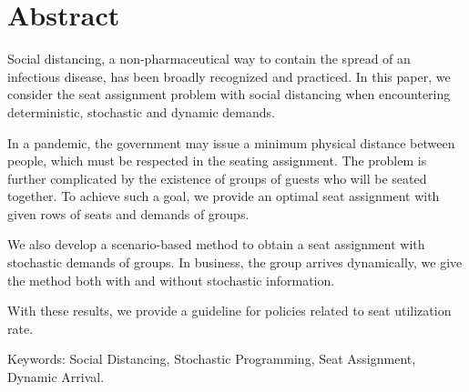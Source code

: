 
\section*{Abstract}
Social distancing, a non-pharmaceutical way to contain the spread of an infectious disease, has been broadly recognized and practiced. In this paper, we consider the seat assignment problem with social distancing when encountering deterministic, stochastic and dynamic demands.

In a pandemic, the government may issue a minimum physical distance between people, which must be respected in the seating assignment. The problem is further complicated by the existence of groups of guests who will be seated together. To achieve such a goal, we provide an optimal seat assignment with given rows of seats and demands of groups.

We also develop a scenario-based method to obtain a seat assignment with stochastic demands of groups. In business, the group arrives dynamically, we give the method both with and without stochastic information.

With these results, we provide a guideline for policies related to seat utilization rate.

Keywords: Social Distancing, Stochastic Programming, Seat Assignment, Dynamic Arrival.
